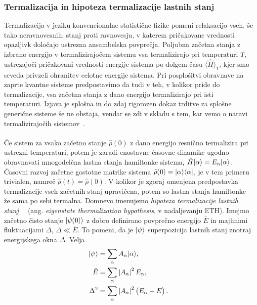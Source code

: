 \documentclass[10pt,a4paper]{article}
\begin{document}
\subsubsection{Termalizacija in hipoteza termalizacije lastnih stanj}
Termalizacija v jeziku konvencionalne statistične fizike pomeni relaksacijo vseh, še tako neravnovesnih, stanj proti ravnovesju, v katerem pričakovane vrednosti opazljivk določajo ustrezna ansambelska povprečja. Poljubna začetna stanja z izbrano energijo v termalizirajočem sistemu vsa termalizirajo pri temperaturi $T$, ustrezajoči pričakovani vrednosti energije sistema po dolgem času $\langle\hat{H}\rangle_T$, kjer smo seveda privzeli ohranitev celotne energije sistema. Pri posplošitvi obravnave na zaprte kvantne sisteme predpostavimo da tudi v teh, v kolikor pride do termalizacije, vsa začetna stanja z dano energijo termalizirajo pri isti temperaturi. Izjava je splošna in do zdaj rigorozen dokaz trditve za splošne generične sisteme še ne obstaja, vendar se zdi v skladu s tem, kar vemo o naravi termalizirajočih sistemov~\cite{nandkishore2015many}.\\\\
Če sistem za vsako začetno stanje $\hat{\rho}(0)$ z dano energijo resnično termalizira pri ustrezni temperaturi, potem je zaradi enostavne časovne dinamike  ugodno obravnavati  mnogodelčna lastna stanja hamiltonke sistema, $\hat{H}\vert\alpha\rangle=E_\alpha\vert\alpha\rangle$. Časovni razvoj začetne gostotne matrike sistema $\hat{\rho}(0)=\vert\alpha\rangle\langle \alpha \vert$, je v tem primeru trivialen, namreč $\hat{\rho}(t)=\hat{\rho}(0)$. V kolikor je zgoraj omenjena predpostavka termalizacije vseh začetnih stanj upravičena, potem so lastna stanja hamiltonke že sama po sebi termalna. Domnevo imenujemo \emph{hipoteza termalizacije lastnih stanj}~\cite{deutsch1991quantum}~\cite{srednicki1999approach} (ang. \emph{eigenstate thermalization hypothesis}, v nadaljevanju ETH).
Imejmo začetno čisto stanje $\vert\psi(0)\rangle$ z dobro definirano povprečno energijo $\bar{E}$ in majhnimi fluktuacijami $\Delta$, $\Delta\ll\bar{E}$. To pomeni, da je $\vert\psi\rangle$ superpozicija lastnih stanj znotraj energijskega okna $\Delta$. Velja~\cite{srednicki1999approach}
\begin{equation}
\begin{split}
\vert\psi\rangle&=\sum\limits_\alpha A_\alpha\vert\alpha\rangle, \\
\bar{E}&=\sum\limits_\alpha \left| A_\alpha \right|^2E_\alpha, \\
\Delta^2&=\sum\limits_\alpha \left| A_\alpha \right|^2\left(E_\alpha - \bar{E}\right).
\end{split}
\end{equation}
\end{document}
